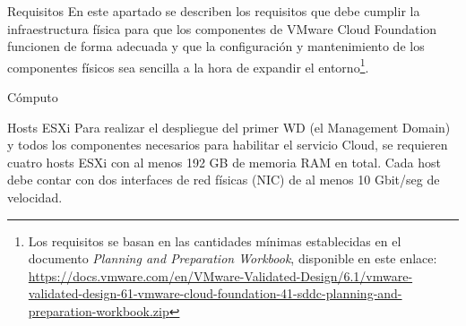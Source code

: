 \begin{section}{Requisitos}
En este apartado se describen los requisitos que debe cumplir la infraestructura física para que los componentes de VMware Cloud Foundation funcionen de forma adecuada y que la configuración y mantenimiento de los componentes físicos sea sencilla a la hora de expandir el entorno\footnote{Los requisitos se basan en las cantidades mínimas establecidas en el documento \textit{Planning and Preparation Workbook}, disponible en este enlace: \url{https://docs.vmware.com/en/VMware-Validated-Design/6.1/vmware-validated-design-61-vmware-cloud-foundation-41-sddc-planning-and-preparation-workbook.zip}}.
\begin{subsection}{Cómputo}
\begin{subsubsection}{Hosts ESXi}
    Para realizar el despliegue del primer WD (el Management Domain) y todos los componentes necesarios para habilitar el servicio Cloud, se requieren cuatro hosts ESXi con al menos 192 GB de memoria RAM en total. Cada host debe contar con dos interfaces de red físicas (NIC) de al menos 10 Gbit/seg de velocidad. 
    

\end{subsubsection}
\end{subsection}
\end{section}
